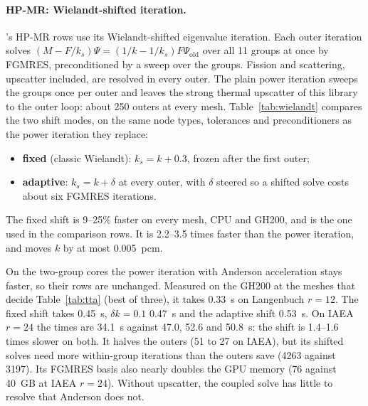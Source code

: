 \paragraph{HP-MR: Wielandt-shifted iteration.} \garnet's HP-MR rows use its
Wielandt-shifted eigenvalue iteration. Each outer iteration solves
$(M - F/k_s)\Psi = (1/k - 1/k_s)F\Psi_{\mathrm{old}}$ over all 11 groups at
once by FGMRES, preconditioned by a sweep over the groups. Fission and
scattering, upscatter included, are resolved in every outer. The plain power
iteration sweeps the groups once per outer and leaves the strong thermal
upscatter of this library to the outer loop: about 250 outers at every mesh.
Table~\ref{tab:wielandt} compares the two shift modes, on the same node types,
tolerances and preconditioners as the power iteration they replace:
\begin{itemize}
\item \textbf{fixed} (classic Wielandt): $k_s = k + 0.3$, frozen after the
  first outer;
\item \textbf{adaptive}: $k_s = k + \delta$ at every outer, with $\delta$
  steered so a shifted solve costs about six FGMRES iterations.
\end{itemize}
The fixed shift is 9--25\% faster on every mesh, CPU and GH200, and is the
one used in the comparison rows. It is 2.2--3.5 times faster than the power
iteration, and moves $k$ by at most 0.005~pcm.

On the two-group cores the power iteration with Anderson acceleration stays
faster, so their rows are unchanged. Measured on the GH200 at the meshes
that decide Table~\ref{tab:tta} (best of three), it takes 0.33~s on
Langenbuch $r=12$. The fixed shift takes 0.45~s, $\delta k = 0.1$ 0.47~s and
the adaptive shift 0.53~s. On IAEA $r=24$ the times are 34.1~s against 47.0,
52.6 and 50.8~s: the shift is 1.4--1.6 times slower on both. It halves the
outers (51 to 27 on IAEA), but its shifted solves need more within-group
iterations than the outers save (4263 against 3197). Its FGMRES basis also
nearly doubles the GPU memory (76 against 40~GB at IAEA $r=24$). Without
upscatter, the coupled solve has little to resolve that Anderson does not.

\begin{table}[h]
\caption{HP-MR steady, \garnet: power iteration (Anderson depth 8) against
the adaptive and fixed Wielandt shift, $\delta k = 0.3$, best of three solve
seconds except CPU $r=6$ (single runs). Speed-up: power iteration over fixed
shift; $|\Delta k|$: fixed shift against power iteration.}
\label{tab:wielandt}
\end{table}

